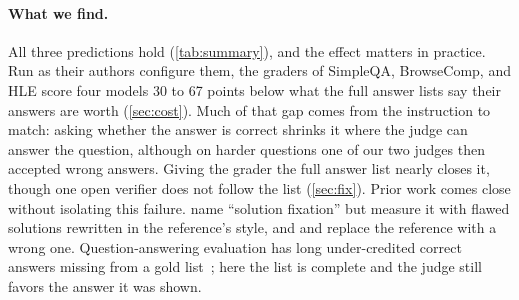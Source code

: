 \documentclass{article}
\begin{document}
\paragraph{What we find.}
All three predictions hold (\cref{tab:summary}), and the effect matters in practice.
Run as their authors configure them, the graders of SimpleQA, BrowseComp, and HLE score four models 30 to 67 points below what the full answer lists say their answers are worth (\cref{sec:cost}).
Much of that gap comes from the instruction to match: asking whether the answer is correct shrinks it where the judge can answer the question, although on harder questions one of our two judges then accepted wrong answers.
Giving the grader the full answer list nearly closes it, though one open verifier does not follow the list (\cref{sec:fix}).
Prior work comes close without isolating this failure.
\citet{fixation2025} name ``solution fixation'' but measure it with flawed solutions rewritten in the reference's style, and \citet{judgingref2026} and \citet{krumdick2025nofreelabels} replace the reference with a wrong one.
Question-answering evaluation has long under-credited correct answers missing from a gold list~\citep{min2020ambigqa,kamalloo2023evaluating}; here the list is complete and the judge still favors the answer it was shown.
\end{document}
